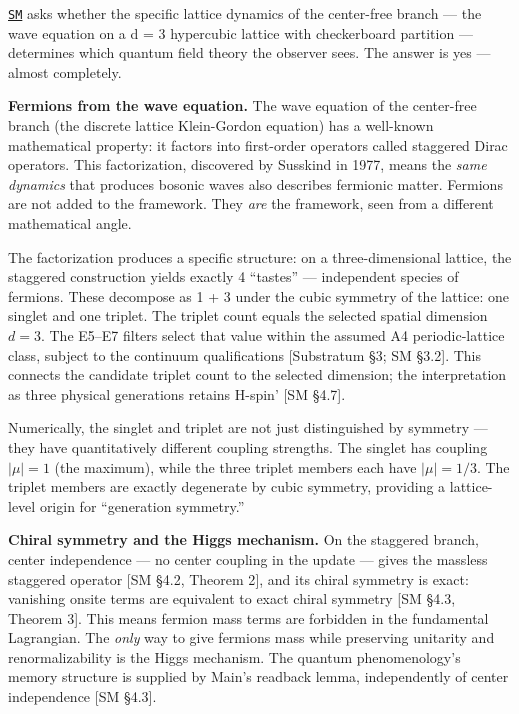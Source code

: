 \documentclass[
]{article}
\begin{document}
\href{SM.md}{\texttt{SM}} asks whether the specific lattice dynamics of
the center-free branch --- the wave equation on a d = 3 hypercubic
lattice with checkerboard partition --- determines which quantum field
theory the observer sees. The answer is yes --- almost completely.

\textbf{Fermions from the wave equation.} The wave equation of the
center-free branch (the discrete lattice Klein-Gordon equation) has a
well-known mathematical property: it factors into first-order operators
called staggered Dirac operators. This factorization, discovered by
Susskind in 1977, means the \emph{same dynamics} that produces bosonic
waves also describes fermionic matter. Fermions are not added to the
framework. They \emph{are} the framework, seen from a different
mathematical angle.

The factorization produces a specific structure: on a three-dimensional
lattice, the staggered construction yields exactly 4 ``tastes'' ---
independent species of fermions. These decompose as 1 + 3 under the
cubic symmetry of the lattice: one singlet and one triplet. The triplet
count equals the selected spatial dimension \(d = 3\). The E5--E7
filters select that value within the assumed A4 periodic-lattice class,
subject to the continuum qualifications {[}Substratum §3; SM §3.2{]}.
This connects the candidate triplet count to the selected dimension; the
interpretation as three physical generations retains H-spin' {[}SM
§4.7{]}.

Numerically, the singlet and triplet are not just distinguished by
symmetry --- they have quantitatively different coupling strengths. The
singlet has coupling \(|\mu| = 1\) (the maximum), while the three
triplet members each have \(|\mu| = 1/3\). The triplet members are
exactly degenerate by cubic symmetry, providing a lattice-level origin
for ``generation symmetry.''

\textbf{Chiral symmetry and the Higgs mechanism.} On the staggered
branch, center independence --- no center coupling in the update ---
gives the massless staggered operator {[}SM §4.2, Theorem 2{]}, and its
chiral symmetry is exact: vanishing onsite terms are equivalent to exact
chiral symmetry {[}SM §4.3, Theorem 3{]}. This means fermion mass terms
are forbidden in the fundamental Lagrangian. The \emph{only} way to give
fermions mass while preserving unitarity and renormalizability is the
Higgs mechanism. The quantum phenomenology's memory structure is
supplied by Main's readback lemma, independently of center independence
{[}SM §4.3{]}.
\end{document}
